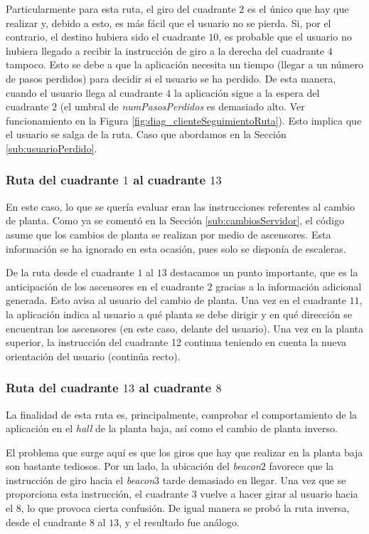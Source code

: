 Particularmente para esta ruta, el giro del cuadrante $2$ es el único que hay que realizar y, debido a esto, es más fácil que el usuario no se pierda. Si, por el contrario, el destino hubiera sido el cuadrante $10$, es probable que el usuario no hubiera llegado a recibir la instrucción de giro a la derecha del cuadrante $4$ tampoco. Esto se debe a que la aplicación necesita un tiempo (llegar a un número de pasos perdidos) para decidir si el usuario se ha perdido. De esta manera, cuando el usuario llega al cuadrante $4$ la aplicación sigue a la espera del cuadrante $2$ (el umbral de \textit{numPasosPerdidos} es demasiado alto. Ver funcionamiento en la Figura \ref{fig:diag_clienteSeguimientoRuta}). Esto implica que el usuario se salga de la ruta. Caso que abordamos en la Sección \ref{sub:usuarioPerdido}.


\subsubsection{Ruta del cuadrante $1$ al cuadrante $13$}

En este caso, lo que se quería evaluar eran las instrucciones referentes al cambio de planta. Como ya se comentó en la Sección \ref{sub:cambiosServidor}, el código asume que los cambios de planta se realizan por medio de ascensores. Esta información se ha ignorado en esta ocasión, pues solo se disponía de escaleras. 

De la ruta desde el cuadrante $1$ al $13$ destacamos un punto importante, que es la anticipación de los ascensores en el cuadrante $2$ gracias a la información adicional generada. Esto avisa al usuario del cambio de planta. Una vez en el cuadrante $11$, la aplicación indica al usuario a qué planta se debe dirigir y en qué dirección se encuentran los ascensores (en este caso, delante del usuario). Una vez en la planta superior, la instrucción del cuadrante 12 continua teniendo en cuenta la nueva orientación del usuario (continúa recto). 

\subsubsection{Ruta del cuadrante $13$ al cuadrante $8$}
\label{subsub:13al8}

La finalidad de esta ruta es, principalmente, comprobar el comportamiento de la aplicación en el \textit{hall} de la planta baja, así como el cambio de planta inverso. 

El problema que surge aquí es que los giros que hay que realizar en la planta baja son bastante tediosos. Por un lado, la ubicación del \textit{beacon$2$} favorece que la instrucción de giro hacia el \textit{beacon$3$} tarde demasiado en llegar. Una vez que se proporciona esta instrucción, el cuadrante $3$ vuelve a hacer girar al usuario hacia el $8$, lo que provoca cierta confusión. De igual manera se probó la ruta inversa, desde el cuadrante $8$ al $13$, y el resultado fue análogo.


